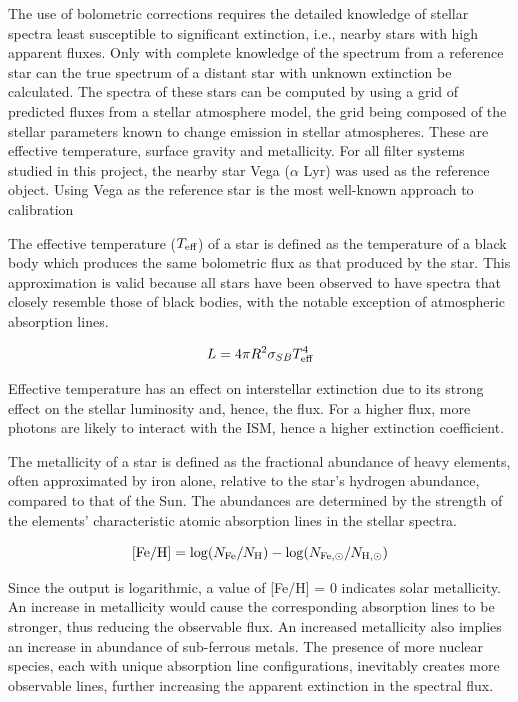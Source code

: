 \documentclass[12pt, a4paper]{report}
\begin{document}
The use of bolometric corrections requires the detailed knowledge of stellar spectra least susceptible to significant extinction, i.e., nearby stars with high apparent fluxes. Only with complete knowledge of the spectrum from a reference star can the true spectrum of a distant star with unknown extinction be calculated. The spectra of these stars can be computed by using a grid of predicted fluxes from a stellar atmosphere model, the grid being composed of the stellar parameters known to change emission in stellar atmospheres. These are effective temperature, surface gravity and metallicity. For all filter systems studied in this project, the nearby star Vega ($\alpha$ Lyr) was used as the reference object. Using Vega as the reference star is the most well-known approach to calibration \citep{2014MNRAS.444..392C}

The effective temperature ($T_{\textnormal{eff}}$) of a star is defined as the temperature of a black body which produces the same bolometric flux as that produced by the star. This approximation is valid because all stars have been observed to have spectra that closely resemble those of black bodies, with the notable exception of atmospheric absorption lines.

\begin{equation}
L = 4 \pi R^{2} \sigma_{SB} T_{\textnormal{eff}}^{4}
\label{Teff_def}
\end{equation}

Effective temperature has an effect on interstellar extinction due to its strong effect on the stellar luminosity and, hence, the flux. For a higher flux, more photons are likely to interact with the ISM, hence a higher extinction coefficient.

The metallicity of a star is defined as the fractional abundance of heavy elements, often approximated by iron alone, relative to the star's hydrogen abundance, compared to that of the Sun. The abundances are determined by the strength of the elements' characteristic atomic absorption lines in the stellar spectra.

\begin{equation}
\textnormal{[Fe/H]} = \log(N_{\textnormal{Fe}}/N_{\textnormal{H}}) - \log(N_{\textnormal{Fe},\odot}/N_{\textnormal{H},\odot})
\label{FeH_def}
\end{equation}

Since the output is logarithmic, a value of [Fe/H] = 0 indicates solar metallicity. An increase in metallicity would cause the corresponding absorption lines to be stronger, thus reducing the observable flux. An increased metallicity also implies an increase in abundance of sub-ferrous metals. The presence of more nuclear species, each with unique absorption line configurations, inevitably creates more observable lines, further increasing the apparent extinction in the spectral flux.
\end{document}
